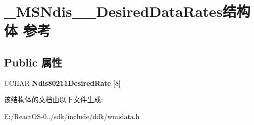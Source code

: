 \hypertarget{struct___m_s_ndis__80211___desired_data_rates}{}\section{\+\_\+\+M\+S\+Ndis\+\_\+\_\+\+Desired\+Data\+Rates结构体 参考}
\label{struct___m_s_ndis__80211___desired_data_rates}
\subsection*{Public 属性}
\begin{DoxyCompactItemize}
\item 
\mbox{\label{struct___m_s_ndis__80211___desired_data_rates_aa6a739bfa29e2fa2bb47ed126e99f77b}} 
U\+C\+H\+AR {\bfseries Ndis80211\+Desired\+Rate} \mbox{[}8\mbox{]}
\end{DoxyCompactItemize}


该结构体的文档由以下文件生成\+:\begin{DoxyCompactItemize}
\item 
E\+:/\+React\+O\+S-\/0../sdk/include/ddk/wmidata.\+h\end{DoxyCompactItemize}
